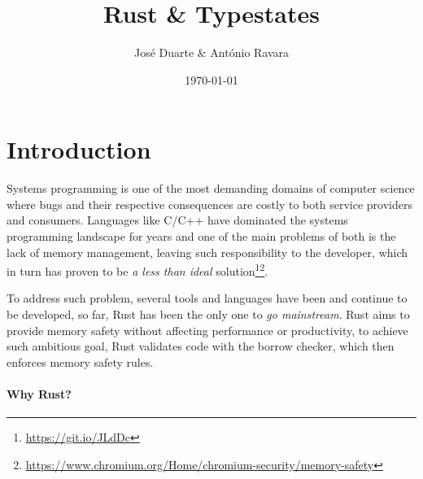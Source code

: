 \documentclass{article}
\title{Rust \& Typestates}
\author{José Duarte \& António Ravara}
\date{\today}
\begin{document}
\maketitle


\section*{Introduction}

%

Systems programming is one of the most demanding domains of computer science where
bugs and their respective consequences are costly to both service providers and consumers.
Languages like C/C++ have dominated the systems programming landscape for years and
one of the main problems of both is the lack of memory management,
leaving such responsibility to the developer,
which in turn has proven to be \emph{a less than ideal} solution\footnote{\url{https://git.io/JLdDc}}\footnote{\url{https://www.chromium.org/Home/chromium-security/memory-safety}}.

To address such problem, several tools and languages have been and continue to be developed,
so far, Rust has been the only one to \emph{go mainstream}.
Rust aims to provide memory safety without affecting performance or productivity,
to achieve such ambitious goal, Rust validates code with the borrow checker, which then enforces memory safety rules.

\paragraph{Why Rust?}
\end{document}
